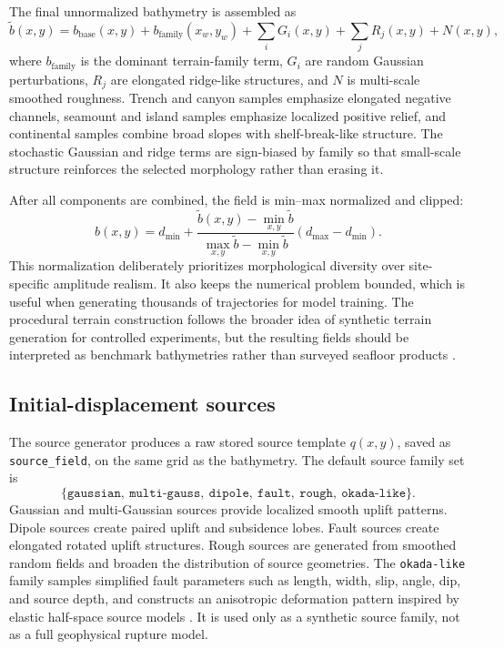The final unnormalized bathymetry is assembled as
\[
\tilde{b}(x,y)=b_{\mathrm{base}}(x,y)
+b_{\mathrm{family}}(x_w,y_w)
+\sum_i G_i(x,y)
+\sum_j R_j(x,y)
+N(x,y),
\]
where $b_{\mathrm{family}}$ is the dominant terrain-family term, $G_i$ are random Gaussian perturbations, $R_j$ are elongated ridge-like structures, and $N$ is multi-scale smoothed roughness. Trench and canyon samples emphasize elongated negative channels, seamount and island samples emphasize localized positive relief, and continental samples combine broad slopes with shelf-break-like structure. The stochastic Gaussian and ridge terms are sign-biased by family so that small-scale structure reinforces the selected morphology rather than erasing it.

After all components are combined, the field is min--max normalized and clipped:
\[
b(x,y)=d_{\min}
+\frac{\tilde{b}(x,y)-\min_{x,y}\tilde{b}}{\max_{x,y}\tilde{b}-\min_{x,y}\tilde{b}}
(d_{\max}-d_{\min}).
\]
This normalization deliberately prioritizes morphological diversity over site-specific amplitude realism. It also keeps the numerical problem bounded, which is useful when generating thousands of trajectories for model training. The procedural terrain construction follows the broader idea of synthetic terrain generation for controlled experiments, but the resulting fields should be interpreted as benchmark bathymetries rather than surveyed seafloor products \citep{musgrave1989terrain,sandwell2014gravity}.

\subsection{Initial-displacement sources}
\label{subsec:initial-displacement-sources}

The source generator produces a raw stored source template $q(x, y)$, saved as \texttt{source\_field}, on the same grid as the bathymetry. The default source family set is
\[
\{\texttt{gaussian},\ \texttt{multi-gauss},\ \texttt{dipole},\ \texttt{fault},\ \texttt{rough},\ \texttt{okada-like}\}.
\]
Gaussian and multi-Gaussian sources provide localized smooth uplift patterns. Dipole sources create paired uplift and subsidence lobes. Fault sources create elongated rotated uplift structures. Rough sources are generated from smoothed random fields and broaden the distribution of source geometries. The \texttt{okada-like} family samples simplified fault parameters such as length, width, slip, angle, dip, and source depth, and constructs an anisotropic deformation pattern inspired by elastic half-space source models \citep{okada1985surface}. It is used only as a synthetic source family, not as a full geophysical rupture model.


